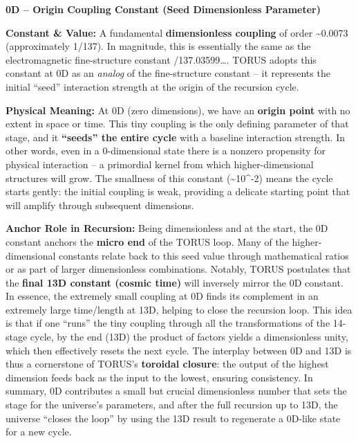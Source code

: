 \documentclass[
]{article}
\begin{document}
\textbf{0D -- Origin Coupling Constant (Seed Dimensionless Parameter)}

\textbf{Constant \& Value:} A fundamental \textbf{dimensionless
coupling} of order \textasciitilde0.0073 (approximately
1/137)\hspace{0pt}. In magnitude, this is essentially the same as the
electromagnetic fine-structure constant \alpha {}/137.03599\ldots\hspace{0pt}. TORUS adopts this constant at 0D as an
\emph{analog} of the fine-structure constant -- it represents the
initial ``seed'' interaction strength at the origin of the recursion
cycle.

\textbf{Physical Meaning:} At 0D (zero dimensions), we have an
\textbf{origin point} with no extent in space or time. This tiny
coupling is the only defining parameter of that stage, and it
\textbf{``seeds'' the entire cycle} with a baseline interaction
strength\hspace{0pt}. In other words, even in a 0-dimensional state
there is a nonzero propensity for physical interaction -- a primordial
kernel from which higher-dimensional structures will grow. The smallness
of this constant (\textasciitilde10\^{}-2) means the cycle starts
gently: the initial coupling is weak, providing a delicate starting
point that will amplify through subsequent dimensions\hspace{0pt}.

\textbf{Anchor Role in Recursion:} Being dimensionless and at the start,
the 0D constant anchors the \textbf{micro end} of the TORUS loop. Many
of the higher-dimensional constants relate back to this seed value
through mathematical ratios or as part of larger dimensionless
combinations. Notably, TORUS postulates that the \textbf{final 13D
constant (cosmic time)} will inversely mirror the 0D
constant\hspace{0pt}. In essence, the extremely small coupling at 0D
finds its complement in an extremely large time/length at 13D, helping
to close the recursion loop. This idea is that if one ``runs'' the tiny
coupling through all the transformations of the 14-stage cycle, by the
end (13D) the product of factors yields a dimensionless unity, which
then effectively resets the next cycle\hspace{0pt}. The interplay
between 0D and 13D is thus a cornerstone of TORUS's \textbf{toroidal
closure}: the output of the highest dimension feeds back as the input to
the lowest, ensuring consistency. In summary, 0D contributes a small but
crucial dimensionless number that sets the stage for the universe's
parameters, and after the full recursion up to 13D, the universe
``closes the loop'' by using the 13D result to regenerate a 0D-like
state for a new cycle\hspace{0pt}.
\end{document}

